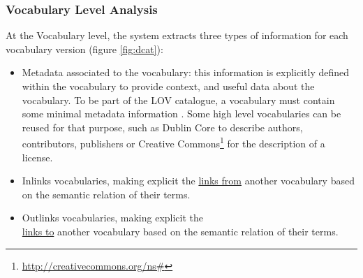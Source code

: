 \documentclass{iosart2c}
\begin{document}
\subsubsection{Vocabulary Level Analysis}
At the Vocabulary level, the system extracts three types of information for each vocabulary version (figure \ref{fig:dcat}):
\begin{itemize}
\item Metadata associated to the vocabulary: this information is explicitly defined within the vocabulary to provide context, and useful data about the vocabulary. To be part of the LOV catalogue, a vocabulary must contain some minimal metadata information \cite{vandenbussche2011metadata}. Some high level vocabularies can be reused for that purpose, such as Dublin Core to describe authors, contributors, publishers or Creative Commons\footnote{\url{http://creativecommons.org/ns#}} for the description of a license.

\item Inlinks vocabularies, making explicit the \underline{links from} another vocabulary based on the semantic relation of their terms.

\item Outlinks vocabularies, making explicit the\\ \underline{links to} another vocabulary based on the semantic relation of their terms.
\end{itemize}
\end{document}
